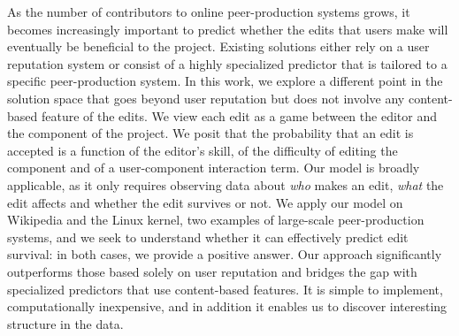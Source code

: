 As the number of contributors to online peer-production systems grows, it becomes increasingly important to predict whether the edits that users make will eventually be beneficial to the project.
Existing solutions either rely on a user reputation system or consist of a highly specialized predictor that is tailored to a specific peer-production system.
In this work, we explore a different point in the solution space that goes beyond user reputation but does not involve any content-based feature of the edits.
We view each edit as a game between the editor and the component of the project.
We posit that the probability that an edit is accepted is a function of the editor's skill, of the difficulty of editing the component and of a user-component interaction term.
Our model is broadly applicable, as it only requires observing data about \emph{who} makes an edit, \emph{what} the edit affects and whether the edit survives or not.
We apply our model on Wikipedia and the Linux kernel, two examples of large-scale peer-production systems, and we seek to understand whether it can effectively predict edit survival:
in both cases, we provide a positive answer.
Our approach significantly outperforms those based solely on user reputation and bridges the gap with specialized predictors that use content-based features.
It is simple to implement, computationally inexpensive, and in addition it enables us to discover interesting structure in the data.

